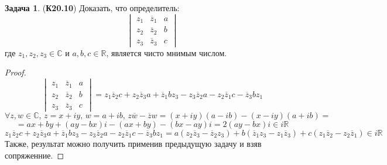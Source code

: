 \documentclass[12pt]{article}
\newcommand{\MR}{\mathbb{R}}
\newcommand{\MC}{\mathbb{C}}
\theoremstyle{definition}
\newtheorem{problem}{Задача}
\newcommand{\ovl}[1]{\overline{#1}}
\begin{document}
\begin{problem}(\textbf{К20.10})
	Доказать, что определитель:
	$$
		\begin{vmatrix}
			z_1 & \ovl{z}_1 & a \\
			z_2 & \ovl{z}_2 & b \\
			z_3 & \ovl{z}_3 & c
		\end{vmatrix}
	$$
	где $z_1,z_2,z_3 \in \MC$ и $a,b,c\in\MR$, является чисто мнимым числом.
\end{problem}

\begin{proof}
	$$
		\begin{vmatrix}
			z_1 & \ovl{z}_1 & a \\
			z_2 & \ovl{z}_2 & b \\
			z_3 & \ovl{z}_3 & c
		\end{vmatrix} = z_1\ovl{z}_2c + z_2\ovl{z}_3a + \ovl{z}_1bz_3 - z_3\ovl{z}_2 a -z_2 \ovl{z}_1c - \ovl{z}_3bz_1
	$$
	$$
		\forall z,w \in \MC, \, z = x + iy, \, w = a + ib, \, z\ovl{w} - \ovl{z}w = (x + iy)(a - ib) - (x -iy)(a + ib) =
	$$
	$$
		= ax +by + (ay -bx)i - (ax +by) - (bx - ay)i = 2(ay - bx)i \in i\MR 
	$$
	$$
		z_1\ovl{z}_2c + z_2\ovl{z}_3a + \ovl{z}_1bz_3 - z_3\ovl{z}_2 a -z_2 \ovl{z}_1c - \ovl{z}_3bz_1 = a(z_2\ovl{z}_3 - \ovl{z}_2z_3) + b(\ovl{z}_1z_3 - z_1\ovl{z}_3) + c(z_1\ovl{z}_2 - z_2\ovl{z}_1) \in i\MR
	$$
	Также, результат можно получить применив предыдущую задачу и взяв сопряженние.
\end{proof}
\end{document}
